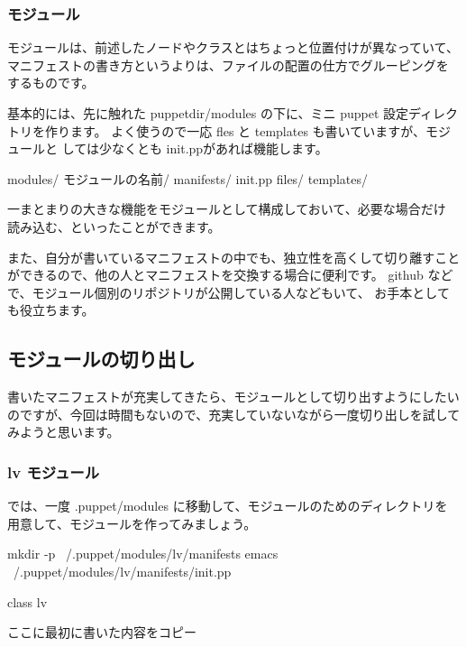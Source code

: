 \documentclass[mingoth,a4paper]{jsarticle}
\begin{document}
\subsubsection{モジュール}

モジュールは、前述したノードやクラスとはちょっと位置付けが異なっていて、
マニフェストの書き方というよりは、ファイルの配置の仕方でグルーピングを
するものです。

基本的には、先に触れた puppetdir/modules の下に、ミニ puppet
設定ディレクトリを作ります。
よく使うので一応 fles と templates も書いていますが、モジュールと
しては少なくとも init.ppがあれば機能します。

\begin{commandline}
modules/
 モジュールの名前/
   manifests/
     init.pp
   files/
   templates/
\end{commandline}

一まとまりの大きな機能をモジュールとして構成しておいて、必要な場合だけ
読み込む、といったことができます。

また、自分が書いているマニフェストの中でも、独立性を高くして切り離すこと
ができるので、他の人とマニフェストを交換する場合に便利です。
github などで、モジュール個別のリポジトリが公開している人などもいて、
お手本としても役立ちます。

\subsection{モジュールの切り出し}

書いたマニフェストが充実してきたら、モジュールとして切り出すようにしたい
のですが、今回は時間もないので、充実していないながら一度切り出しを試して
みようと思います。

\subsubsection{lv モジュール}

では、一度 .puppet/modules に移動して、モジュールのためのディレクトリを
用意して、モジュールを作ってみましょう。

\begin{commandline}
mkdir -p ~/.puppet/modules/lv/manifests
emacs ~/.puppet/modules/lv/manifests/init.pp
\end{commandline}
 
\begin{commandline}
class lv {

ここに最初に書いた内容をコピー

}
\end{commandline}
\end{document}
